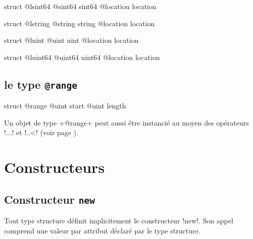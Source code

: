 
\begin{galgas}
struct @lsint64 {
  @sint64 sint64
  @location location
}
\end{galgas}








\begin{galgas}
struct @lstring {
  @string string
  @location location
}
\end{galgas}








\begin{galgas}
struct @luint {
  @uint uint
  @location location
}
\end{galgas}






\begin{galgas}
struct @luint64 {
  @uint64 uint64
  @location location
}
\end{galgas}


\subsection{le type \texttt{@range}}

\begin{galgas}
struct @range {
  @uint start
  @uint length
}
\end{galgas}

Un objet de type \ggs+@range+ peut aussi être instancié au moyen des opérateurs \ggs!...! et \ggs!..<! (voir page ).


\section{Constructeurs}

\subsection{Constructeur \texttt{new}}

Tout type structure définit implicitement le constructeur \ggs!new!. Son appel comprend une valeur par attribut déclaré par le type structure.

